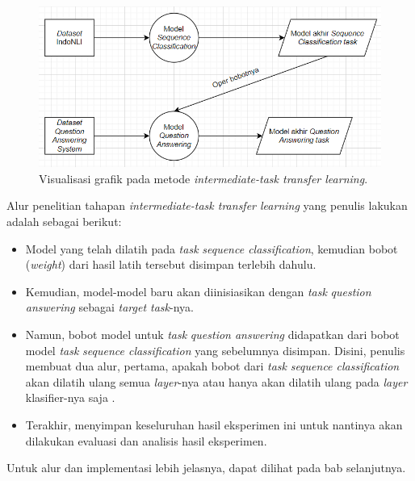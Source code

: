 \begin{figure}[h]
\includegraphics[width=\linewidth]{assets/pics/alur1.png}
\centering
\caption{Visualisasi grafik pada metode \emph{intermediate-task transfer learning}.}
\end{figure}

Alur penelitian tahapan \emph{intermediate-task transfer learning} yang penulis lakukan adalah sebagai berikut:

\begin{itemize}

    \item Model yang telah dilatih pada \emph{task} \emph{sequence classification}, kemudian bobot (\emph{weight}) dari hasil latih tersebut disimpan terlebih dahulu.

    \item Kemudian, model-model baru akan diinisiasikan dengan \emph{task} \emph{question answering} sebagai \emph{target task}-nya.

    \item Namun, bobot model untuk \emph{task} \emph{question answering} didapatkan dari bobot model \emph{task} \emph{sequence classification} yang sebelumnya disimpan. Disini, penulis membuat dua alur, pertama, apakah bobot dari  \emph{task} \emph{sequence classification} akan dilatih ulang semua \emph{layer}-nya atau hanya akan dilatih ulang pada \emph{layer} klasifier-nya saja \citep{lee2019elsa}.

    \item Terakhir, menyimpan keseluruhan hasil eksperimen ini untuk nantinya akan dilakukan evaluasi dan analisis hasil eksperimen.

\end{itemize}

Untuk alur dan implementasi lebih jelasnya, dapat dilihat pada bab selanjutnya.

